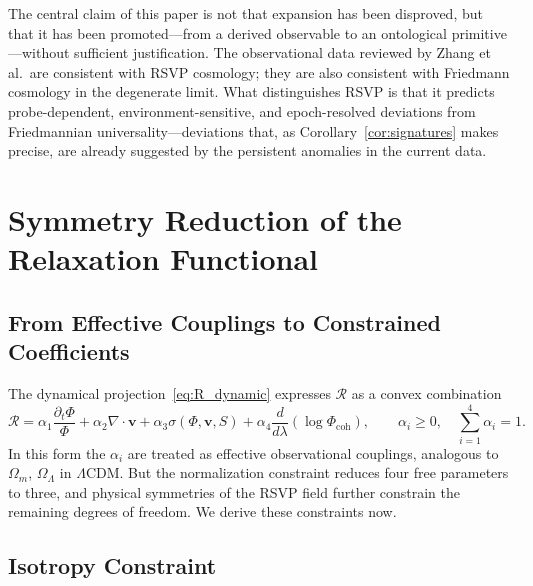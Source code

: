 \documentclass[12pt,a4paper]{article}
\theoremstyle{remark}
\newcommand{\vv}{\mathbf{v}}
\newcommand{\Rcal}{\mathcal{R}}
\begin{document}
The central claim of this paper is not that expansion has been disproved, but that it has been promoted---from a derived observable to an ontological primitive---without sufficient justification. The observational data reviewed by Zhang et al.\ are consistent with RSVP cosmology; they are also consistent with Friedmann cosmology in the degenerate limit. What distinguishes RSVP is that it predicts probe-dependent, environment-sensitive, and epoch-resolved deviations from Friedmannian universality---deviations that, as Corollary~\ref{cor:signatures} makes precise, are already suggested by the persistent anomalies in the current data.


\section{Symmetry Reduction of the Relaxation Functional}
\label{sec:symmetry}

\subsection{From Effective Couplings to Constrained Coefficients}

The dynamical projection~\eqref{eq:R_dynamic} expresses $\Rcal$ as a convex combination
\begin{equation}
\Rcal = \alpha_1 \frac{\partial_t \Phi}{\Phi} + \alpha_2 \nabla \cdot \vv
      + \alpha_3 \sigma(\Phi,\vv,S)
      + \alpha_4 \frac{d}{d\lambda}\!\left(\log \Phi_{\mathrm{coh}}\right),
\qquad \alpha_i \ge 0, \quad \sum_{i=1}^4 \alpha_i = 1.
\end{equation}
In this form the $\alpha_i$ are treated as effective observational couplings,
analogous to $\Omega_m$, $\Omega_\Lambda$ in $\Lambda$CDM. But the
normalization constraint reduces four free parameters to three, and physical
symmetries of the RSVP field further constrain the remaining degrees of freedom.
We derive these constraints now.

\subsection{Isotropy Constraint}
\end{document}
